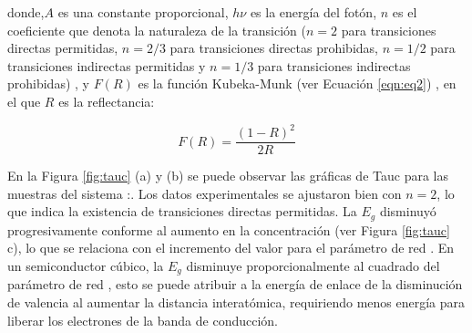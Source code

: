 donde,$A$ es una constante proporcional, $h \nu$ es la energía del fotón, $n$
es el coeficiente que denota la naturaleza de la transición ($n=2$ para
transiciones directas permitidas, $n=2/3$ para transiciones directas
prohibidas, $n=1/2$ para transiciones indirectas permitidas y $n=1/3$ para
transiciones indirectas prohibidas) \cite{Mott1970}, y $F(R)$ es la función
Kubeka-Munk
(ver Ecuación \ref{eqn:eq2}) \cite{Simmons1975}, en el que $R$ es la
reflectancia:

\begin{equation}
    F(R)=\frac{(1-R)^2}{2R}
    \label{eqn:eq2}
\end{equation}

En la Figura \ref{fig:tauc} (a) y (b) se puede observar las gráficas de Tauc para
las
muestras del sistema :. Los datos
experimentales se
ajustaron bien con $n = 2$, lo que indica la existencia de transiciones
directas
permitidas. La $E_{g}$ disminuyó progresivamente conforme al aumento en la
concentración  (ver Figura \ref{fig:tauc} c), lo que se relaciona
con el
incremento del
valor para el parámetro de red \cite{J.C.Inkson2012}. En un semiconductor
cúbico, la $E_{g}$
disminuye proporcionalmente al cuadrado del parámetro de red \cite{Dalven1973},
esto se
puede atribuir a la energía de enlace de la disminución de valencia al aumentar
la distancia interatómica, requiriendo menos energía para liberar los
electrones de la banda de conducción.\\

